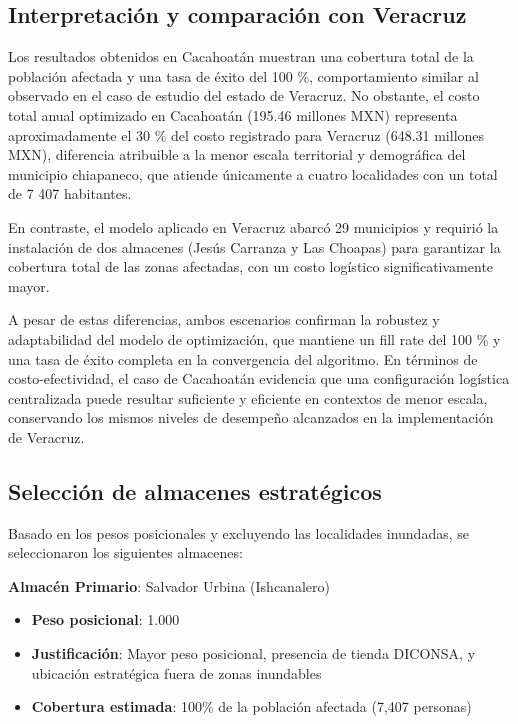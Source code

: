 \documentclass[
  spanish,
  us-letterpaper,
]{scrreprt}
\providecommand{\tightlist}{%
  \setlength{\itemsep}{0pt}\setlength{\parskip}{0pt}}
\numberwithin{equation}{chapter} %
\begin{document}
\subsection{Interpretación y comparación con
Veracruz}\label{interpretaciuxf3n-y-comparaciuxf3n-con-veracruz}

Los resultados obtenidos en Cacahoatán muestran una cobertura total de
la población afectada y una tasa de éxito del 100 \%, comportamiento
similar al observado en el caso de estudio del estado de Veracruz. No
obstante, el costo total anual optimizado en Cacahoatán (195.46 millones
MXN) representa aproximadamente el 30 \% del costo registrado para
Veracruz (648.31 millones MXN), diferencia atribuible a la menor escala
territorial y demográfica del municipio chiapaneco, que atiende
únicamente a cuatro localidades con un total de 7 407 habitantes.

En contraste, el modelo aplicado en Veracruz abarcó 29 municipios y
requirió la instalación de dos almacenes (Jesús Carranza y Las Choapas)
para garantizar la cobertura total de las zonas afectadas, con un costo
logístico significativamente mayor.

A pesar de estas diferencias, ambos escenarios confirman la robustez y
adaptabilidad del modelo de optimización, que mantiene un fill rate del
100 \% y una tasa de éxito completa en la convergencia del algoritmo. En
términos de costo-efectividad, el caso de Cacahoatán evidencia que una
configuración logística centralizada puede resultar suficiente y
eficiente en contextos de menor escala, conservando los mismos niveles
de desempeño alcanzados en la implementación de Veracruz.

\subsection{Selección de almacenes
estratégicos}\label{selecciuxf3n-de-almacenes-estratuxe9gicos}

Basado en los pesos posicionales y excluyendo las localidades inundadas,
se seleccionaron los siguientes almacenes:

\textbf{Almacén Primario}: Salvador Urbina (Ishcanalero)

\begin{itemize}
\tightlist
\item
  \textbf{Peso posicional}: 1.000
\item
  \textbf{Justificación}: Mayor peso posicional, presencia de tienda
  DICONSA, y ubicación estratégica fuera de zonas inundables
\item
  \textbf{Cobertura estimada}: 100\% de la población afectada (7,407
  personas)
\end{itemize}
\end{document}
